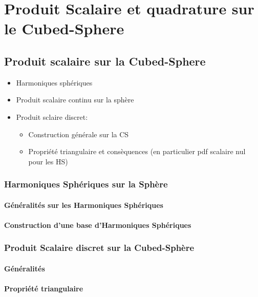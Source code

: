 
\chapter{Produit Scalaire et quadrature sur le Cubed-Sphere}


\section{Produit scalaire sur la Cubed-Sphere}

\begin{itemize}
\item Harmoniques sphériques
\item Produit scalaire continu sur la sphère
\item Produit sclaire discret:
\begin{itemize}
\item Construction générale sur la CS
\item Propriété triangulaire et consèquences (en particulier pdf scalaire nul pour les HS)
\end{itemize}
\end{itemize}

\subsection{Harmoniques Sphériques sur la Sphère}

\subsubsection{Généralités sur les Harmoniques Sphériques}

\subsubsection{Construction d'une base d'Harmoniques Sphériques}

\subsection{Produit Scalaire discret sur la Cubed-Sphère}

\subsubsection{Généralités}

\subsubsection{Propriété triangulaire}













